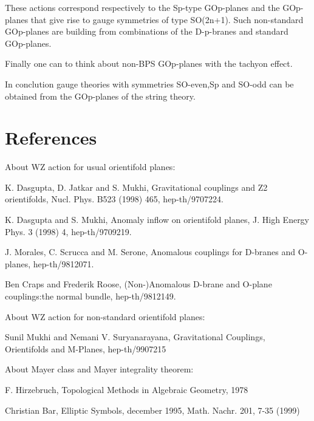 \documentclass[a4paper,a4paper]{article}
\begin{document}
\begin{center}
{  \coordHE{} }
\end{center}

These actions correspond respectively to the Sp-type GOp-planes and the GOp-planes that give rise to gauge symmetries of type SO(2n+1).  Such non-standard GOp-planes are building from combinations of the D-p-branes and standard GOp-planes.

Finally one can to think about non-BPS GOp-planes with the tachyon effect.

In conclution gauge theories with symmetries SO-even,Sp and SO-odd can be obtained from the GOp-planes of the string theory.

\section{References}

\setlength{\baselineskip}{20pt}
About WZ action for usual orientifold planes:

K. Dasgupta, D. Jatkar and S. Mukhi, Gravitational couplings and Z2 orientifolds, Nucl. Phys. B523 (1998) 465, hep-th/9707224.

K. Dasgupta and S. Mukhi, Anomaly inflow on orientifold planes, J. High Energy Phys. 3 (1998) 4, hep-th/9709219.

J. Morales, C. Scrucca and M. Serone, Anomalous couplings for D-branes and O-planes, hep-th/9812071.

Ben Craps and Frederik Roose, (Non-)Anomalous D-brane and O-plane couplings:the normal bundle,  hep-th/9812149.

About WZ action for non-standard orientifold planes:

Sunil Mukhi and Nemani V. Suryanarayana,  Gravitational Couplings, Orientifolds and M-Planes,  hep-th/9907215


About Mayer class and Mayer integrality theorem:

F. Hirzebruch, Topological Methods in Algebraic Geometry, 1978

Christian Bar,  Elliptic Symbols, december 1995, Math. Nachr. 201, 7-35 (1999)

\setlength{\baselineskip}{50pt}   
\end{document}
